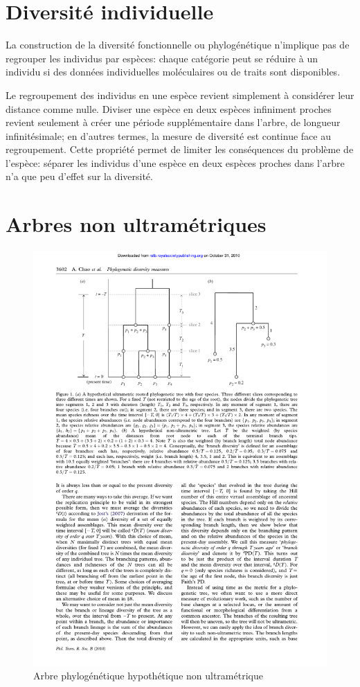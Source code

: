\documentclass[
  11pt,
  french,
  a4paper,
  extrafontsizes,onecolumn,openright
  ]{memoir}
\begin{document}
\normalsize

\hypertarget{diversituxe9-individuelle}{%
\section{Diversité individuelle}\label{diversituxe9-individuelle}}

La construction de la diversité fonctionnelle ou phylogénétique n'implique pas de regrouper les individus par espèces: chaque catégorie peut se réduire à un individu si des données individuelles moléculaires ou de traits sont disponibles.

Le regroupement des individus en une espèce revient simplement à considérer leur distance comme nulle.
Diviser une espèce en deux espèces infiniment proches revient seulement à créer une période supplémentaire dans l'arbre, de longueur infinitésimale; en d'autres termes, la mesure de diversité est continue face au regroupement.
Cette propriété permet de limiter les conséquences du problème de l'espèce: séparer les individus d'une espèce en deux espèces proches dans l'arbre n'a que peu d'effet sur la diversité.

\hypertarget{arbres-non-ultramuxe9triques}{%
\section{Arbres non ultramétriques}\label{arbres-non-ultramuxe9triques}}

\scriptsize

\begin{figure}

{\centering \includegraphics[width=0.4\linewidth]{images/Chao2010} 

}

\caption{Arbre phylogénétique hypothétique non ultramétrique}\label{fig:Chao2010}
\end{figure}
\end{document}
